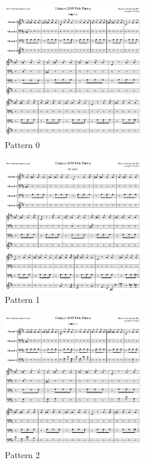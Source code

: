 \begin{figure}[H]
{
    \begin{subfigure}{0.43\textwidth}
        \includegraphics[width=6cm]{src/titletune/sheet_music/title_no_0_page_1001.png}%
      \caption*{Pattern 0}
    \end{subfigure}
    \begin{subfigure}{0.43\textwidth}
        \includegraphics[width=6cm]{src/titletune/sheet_music/title_no_1_page_1001.png}%
      \caption*{Pattern 1}
    \end{subfigure}
    \begin{subfigure}{0.43\textwidth}
        \includegraphics[width=6cm]{src/titletune/sheet_music/title_no_2_page_1001.png}%
      \caption*{Pattern 2}
    \end{subfigure}
    \begin{subfigure}{0.43\textwidth}

\end{subfigure}}
\end{figure}
